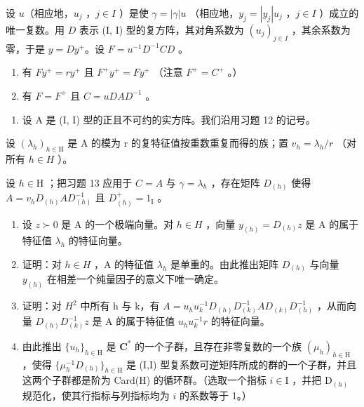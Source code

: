 设 \(u\)（相应地，\(u_j\) ，\(j \in I\) ）是使 \(\gamma = |\gamma|u\) （相应地，\(y_j = |y_j|u_j\) ，\(j \in I\) ）成立的唯一复数。用 \(D\) 表示 (I, I) 型的复方阵，其对角系数为 \((u_j)_{j \in I}\) ，其余系数为零，于是 \(y = Dy^+\)。设 \(F = u^{-1}D^{-1}CD\) 。

\begin{enumerate}
\def\labelenumi{\alph{enumi})}
\setcounter{enumi}{2}
\item
  有 \(Fy^{+} = ry^{+}\) 且 \(F^{+}y^{+} = Fy^{+}\) （注意 \(F^{+} = C^{+}\) 。）
\item
  有 \(F = F^{+}\) 且 \(C = uDAD^{-1}\) 。
\end{enumerate}

\begin{enumerate}
\def\labelenumi{\arabic{enumi})}
\setcounter{enumi}{13}
\tightlist
\item
  设 A 是 (I, I) 型的正且不可约的实方阵。我们沿用习题 12 的记号。
\end{enumerate}

设 \((\lambda_{h})_{h\in\mathrm{H}}\) 是 A 的模为 r 的复特征值按重数重复而得的族；置 \(v_{h}=\lambda_{h}/r\) （对所有 \(h\in H\) ）。

设 \(h \in \mathrm{H}\) ；把习题 13 应用于 \(C = A\) 与 \(\gamma = \lambda_h\) ，存在矩阵 \(D_{(h)}\) 使得 \(A = v_h D_{(h)} AD_{(h)}^{-1}\) 且 \(D_{(h)}^+ = 1_{\mathrm{I}}\) 。

\begin{enumerate}
\def\labelenumi{\alph{enumi})}
\item
  设 \(z \succ 0\) 是 A 的一个极端向量。对 \(h \in H\) ，向量 \(y_{(h)} = D_{(h)}z\) 是 A 的属于特征值 \(\lambda_{h}\) 的特征向量。
\item
  证明：对 \(h \in H\) ，A 的特征值 \(\lambda_{h}\) 是单重的。由此推出矩阵 \(D_{(h)}\) 与向量 \(y_{(h)}\) 在相差一个纯量因子的意义下唯一确定。
\item
  证明：对 \(H^{2}\) 中所有 h 与 k，有 \(A = u_{h}u_{k}^{-1}D_{(h)}D_{(k)}^{-1}AD_{(k)}D_{(h)}^{-1}\) ，从而向量 \(D_{(h)}D_{(k)}^{-1}z\) 是 A 的属于特征值 \(u_{h}u_{k}^{-1}r\) 的特征向量。
\item
  由此推出 \(\{u_h\}_{h\in \mathrm{H}}\) 是 \(\mathbf{C}^*\) 的一个子群，且存在非零复数的一个族 \((\mu_h)_{h\in \mathrm{H}}\) ，使得 \(\{\mu_h^{-1}D_{(h)}\}_{h\in \mathrm{H}}\) 是 (I,I) 型复系数可逆矩阵所成的群的一个子群，并且这两个子群都是阶为 Card(H) 的循环群。（选取一个指标 \(i\in \mathrm{I}\) ，并把 \(\mathrm{D}_{(h)}\) 规范化，使其行指标与列指标均为 \(i\) 的系数等于 1。）
\end{enumerate}

